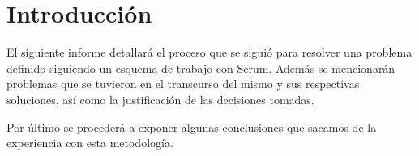 \section{Introducción}

El siguiente informe detallará el proceso que se siguió para resolver una problema definido siguiendo un esquema de trabajo con Scrum. Además se mencionarán problemas que se tuvieron en el transcurso del mismo y sus respectivas soluciones, así como la justificación de las decisiones tomadas.

Por último se procederá a exponer algunas conclusiones que sacamos de la experiencia con esta metodología.

